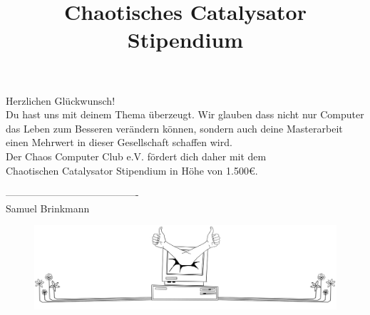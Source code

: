 \documentclass{article}
\title{Chaotisches Catalysator Stipendium}
\newcommand{\smallfont}[1]{{%
  \fontsize{13pt}{15pt}\normalfont #1%
}}
\newcommand{\normfont}[1]{{%
  \fontsize{20pt}{24pt}\normalfont #1%
}}
\newcommand{\bigfont}[1]{{%
  \fontsize{30pt}{36pt}\normalfont #1%
}}
\begin{document}

\vspace{2cm}

\begin{adjustwidth}{3cm}{3cm}
    \smallfont{\firasans \RaggedRight Herzlichen Glückwunsch! \\ \smallskip
    Du hast uns mit deinem Thema überzeugt. Wir glauben dass nicht nur Computer das Leben zum Besseren verändern können, sondern auch deine Masterarbeit einen Mehrwert in dieser Gesellschaft schaffen wird. \\
    Der Chaos Computer Club e.V. fördert dich daher mit dem \\ Chaotischen Catalysator Stipendium in Höhe von 1.500€. \\[4\baselineskip]
    \par}
\end{adjustwidth}

\begin{adjustwidth}{3cm}{3cm}
    \RaggedLeft ---------------------------------------- \\
    \smallfont{\firasans Samuel Brinkmann}
\end{adjustwidth}

\begin{figure}[b]
	\begin{center}
		\includegraphics[width=0.9\paperwidth] {bottom-decoration}
	\end{center}
\end{figure}
\end{document}
